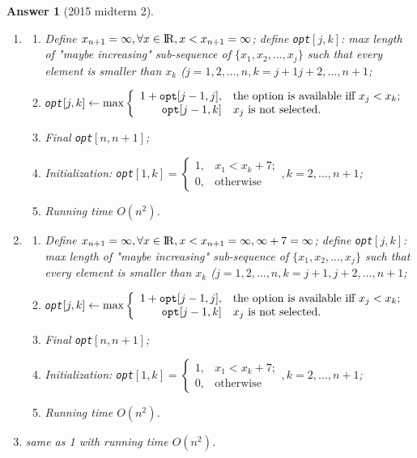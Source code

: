 \documentclass[11pt]{article}
\newcommand {\Reals}  {{\rm I \! R}}
\theoremstyle{numberplain}
\theoremstyle{nonumberplain}
\newtheorem{ans}{Answer}
\newcommand{\0}{{\mathbf{0}}}
\begin{document}
\begin{ans}[2015 midterm 2]
\begin{enumerate}
\item 
\begin{enumerate}
\item Define $x_{n+1}=\infty,\forall x\in\Reals,x<x_{n+1}=\infty$; define
{\tt opt}$[j,k]$: max length of "maybe increasing" sub-sequence of $\{x_1,x_2,\ldots,x_j\}$ such that every element is smaller than $x_k$ ($j=1,2,\ldots, n,k=j+1j+2,\ldots,n+1$;
\item {\tt opt}$[j,k]\leftarrow\max\left\{
\begin{array}{rl}
1+{\tt opt}[j-1,j], & \text{the option is available iff } x_j<x_k; \\
{\tt opt}[j-1,k] & x_j \text{ is not selected}.
\end{array}
\right.$
\item Final {\tt opt}$[n,n+1]$;
\item Initialization: {\tt opt}$[1,k]=\left\{
\begin{array}{rl}
1, & x_1<x_k+7;\\
0,&\text{otherwise}
\end{array}
\right., k=2,\ldots, n+1$;
\item Running time $O(n^2)$.
\end{enumerate}
\item 
\begin{enumerate}
\item Define $x_{n+1}=\infty,\forall x\in\Reals,x<x_{n+1}=\infty,\infty+7=\infty$; define
{\tt opt}$[j,k]$: max length of "maybe increasing" sub-sequence of $\{x_1,x_2,\ldots,x_j\}$ such that every element is smaller than $x_k$ ($j=1,2,\ldots, n,k=j+1,j+2,\ldots,n+1$;
\item {\tt opt}$[j,k]\leftarrow\max\left\{
\begin{array}{rl}
1+{\tt opt}[j-1,j], & \text{the option is available iff } x_j<x_k; \\
{\tt opt}[j-1,k] & x_j \text{ is not selected}.
\end{array}
\right.$
\item Final {\tt opt}$[n,n+1]$;
\item Initialization: {\tt opt}$[1,k]=\left\{
\begin{array}{rl}
1, & x_1<x_k+7;\\
0,&\text{otherwise}
\end{array}
\right., k=2,\ldots, n+1$;
\item Running time $O(n^2)$.
\end{enumerate}
\item same as 1 with running time $O(n^2)$.
\end{enumerate}
\end{ans}
\end{document}
